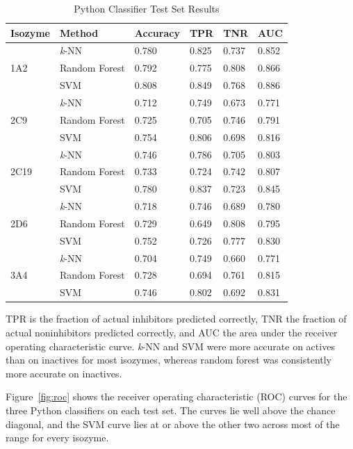 \begin{table}[H]
\caption{Python Classifier Test Set Results}
\centering
\begin{tabular}{|l|l|l|l|l|l|}
\hline
Isozyme & Method & Accuracy & TPR & TNR & AUC \\ \hline
\multirow{3}{*}{1A2} & \textit{k}-NN & 0.780 & 0.825 & 0.737 & 0.852 \\ \cline{2-6}
 & Random Forest & 0.792 & 0.775 & 0.808 & 0.866 \\ \cline{2-6}
 & SVM & 0.808 & 0.849 & 0.768 & 0.886 \\ \hline
\multirow{3}{*}{2C9} & \textit{k}-NN & 0.712 & 0.749 & 0.673 & 0.771 \\ \cline{2-6}
 & Random Forest & 0.725 & 0.705 & 0.746 & 0.791 \\ \cline{2-6}
 & SVM & 0.754 & 0.806 & 0.698 & 0.816 \\ \hline
\multirow{3}{*}{2C19} & \textit{k}-NN & 0.746 & 0.786 & 0.705 & 0.803 \\ \cline{2-6}
 & Random Forest & 0.733 & 0.724 & 0.742 & 0.807 \\ \cline{2-6}
 & SVM & 0.780 & 0.837 & 0.723 & 0.845 \\ \hline
\multirow{3}{*}{2D6} & \textit{k}-NN & 0.718 & 0.746 & 0.689 & 0.780 \\ \cline{2-6}
 & Random Forest & 0.729 & 0.649 & 0.808 & 0.795 \\ \cline{2-6}
 & SVM & 0.752 & 0.726 & 0.777 & 0.830 \\ \hline
\multirow{3}{*}{3A4} & \textit{k}-NN & 0.704 & 0.749 & 0.660 & 0.771 \\ \cline{2-6}
 & Random Forest & 0.728 & 0.694 & 0.761 & 0.815 \\ \cline{2-6}
 & SVM & 0.746 & 0.802 & 0.692 & 0.831 \\ \hline
\end{tabular}
\end{table}

TPR is the fraction of actual inhibitors predicted correctly, TNR the fraction of actual noninhibitors predicted correctly, and AUC the area under the receiver operating characteristic curve. \textit{k}-NN and SVM were more accurate on actives than on inactives for most isozymes, whereas random forest was consistently more accurate on inactives.

Figure~\ref{fig:roc} shows the receiver operating characteristic (ROC) curves for the three Python classifiers on each test set. The curves lie well above the chance diagonal, and the SVM curve lies at or above the other two across most of the range for every isozyme.

